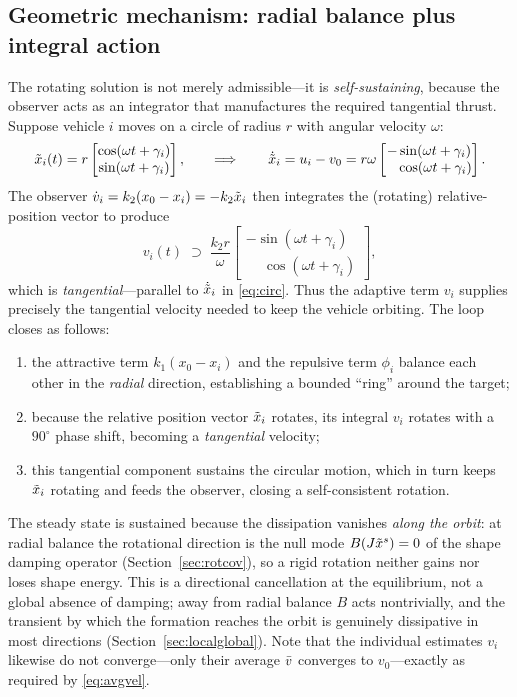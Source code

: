 \subsection{Geometric mechanism: radial balance plus integral action}
The rotating solution is not merely admissible---it is \emph{self-sustaining}, because the observer
acts as an integrator that manufactures the required tangential thrust. Suppose vehicle $i$ moves on
a circle of radius $r$ with angular velocity $\omega$:
\begin{equation}
  \tilde{x}_i(t)=r
  \begin{bmatrix}
    \cos(\omega t+\gamma_i)\\
    \sin(\omega t+\gamma_i)
  \end{bmatrix},
  \qquad\Longrightarrow\qquad
  \dot{\tilde{x}}_i=u_i-v_0=r\omega
  \begin{bmatrix}
    -\sin(\omega t+\gamma_i)\\
    \phantom{-}\cos(\omega t+\gamma_i)
  \end{bmatrix}.
  \label{eq:circ}
\end{equation}
The observer $\dot{v}_i=k_2(x_0-x_i)=-k_2\tilde{x}_i$ then integrates the (rotating) relative-position
vector to produce
\begin{equation}
  v_i(t)\;\supset\;
  \frac{k_2 r}{\omega}
  \begin{bmatrix}
    -\sin(\omega t+\gamma_i)\\
    \phantom{-}\cos(\omega t+\gamma_i)
  \end{bmatrix},
  \label{eq:observer_out}
\end{equation}
which is \emph{tangential}---parallel to $\dot{\tilde{x}}_i$ in \eqref{eq:circ}. Thus the adaptive term
$v_i$ supplies precisely the tangential velocity needed to keep the vehicle orbiting. The loop closes
as follows:
\begin{enumerate}[leftmargin=2.5em]
  \item the attractive term $k_1(x_0-x_i)$ and the repulsive term $\phi_i$ balance each other in the
        \emph{radial} direction, establishing a bounded ``ring'' around the target;
  \item because the relative position vector $\tilde{x}_i$ rotates, its integral $v_i$ rotates with a
        $90^\circ$ phase shift, becoming a \emph{tangential} velocity;
  \item this tangential component sustains the circular motion, which in turn keeps $\tilde{x}_i$ rotating
        and feeds the observer, closing a self-consistent rotation.
\end{enumerate}
The steady state is sustained because the dissipation vanishes \emph{along the orbit}: at radial
balance the rotational direction is the null mode $B(J\tilde{x}^s)=0$ of the shape damping operator
(Section~\ref{sec:rotcov}), so a rigid rotation neither gains nor loses shape energy. This is a
directional cancellation at the equilibrium, not a global absence of damping; away from radial
balance $B$ acts nontrivially, and the transient by which the formation reaches the orbit is
genuinely dissipative in most directions (Section~\ref{sec:localglobal}). Note that the individual
estimates $v_i$ likewise do not converge---only their average $\bar{v}$ converges to $v_0$---exactly as
required by \eqref{eq:avgvel}.

